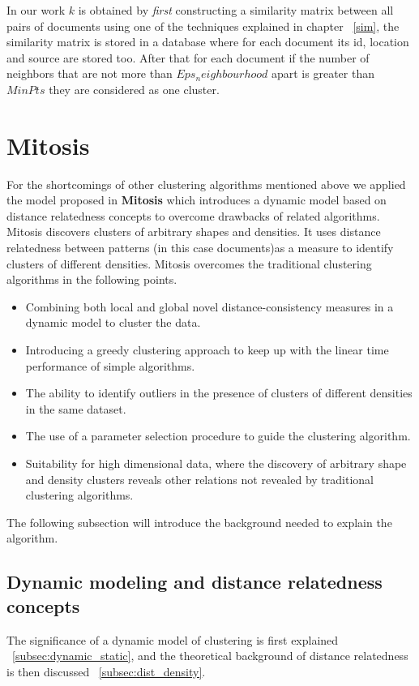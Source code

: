 In our work $k$ is obtained by \textit{first} constructing a similarity matrix between all pairs of documents using one of the techniques explained in chapter ~\ref{sim}, the similarity matrix is stored in a database where for each document its id, location and source are stored too. After that for each document if the number of neighbors  that are not more than $Eps_neighbourhood$ apart is greater than $MinPts$ they are considered as one cluster.

\section{Mitosis}\label{mitosis}
For the shortcomings of other clustering algorithms mentioned above we applied the model proposed in \textbf{Mitosis} \citep{Mitosis_1} which introduces a dynamic model based on distance relatedness concepts to overcome drawbacks of related algorithms. Mitosis discovers clusters of arbitrary shapes and densities. It uses distance relatedness between patterns (in this case documents)as a measure to identify clusters of different densities.
Mitosis overcomes the traditional clustering algorithms in the following points.
\begin{itemize}
\item{Combining both local and global novel distance-consistency measures in a dynamic model to cluster the data.}
\item{Introducing a greedy clustering approach to keep up with the linear time performance of simple algorithms.}
\item{The ability to identify outliers in the presence of clusters of different densities in the same dataset.}
\item{The use of a parameter selection procedure to guide the clustering algorithm.}
\item{Suitability for high dimensional data, where the discovery of arbitrary shape and density clusters reveals other relations not revealed by traditional clustering algorithms.}
\end{itemize}
The following subsection will introduce the background needed to explain the algorithm.
\subsection{Dynamic modeling and distance relatedness concepts}\label{sec:background}

The significance of a dynamic model of clustering is first explained ~\ref{subsec:dynamic_static}, and the theoretical background of distance relatedness is then discussed ~\ref{subsec:dist_density}.

